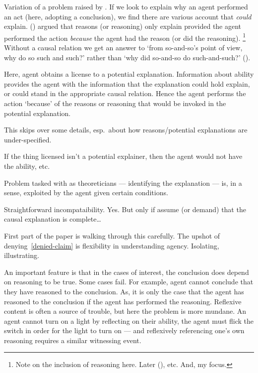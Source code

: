 \documentclass[10pt]{article}
\begin{document}
Variation of a problem raised by \citeauthor{Davidson:2001aa}.
If we look to explain why an agent performed an act (here, adopting a conclusion), we find there are various account that \emph{could} explain.
(\citeauthor[7--8]{Davidson:2001aa})
\citeauthor{Davidson:2001aa} argued that reasons (or reasoning) only explain provided the agent performed the action \emph{because} the agent had the reason (or did the reasoning).\nolinebreak
\footnote{
  Note on the inclusion of reasoning here.
  Later \citeauthor{Davidson:2001aa} (\citeyear[232]{Davidson:2001aa}), etc.
  And, my focus.
}
Without a causal relation we get an answer to ‘from so-and-so’s point of view, why do so such and such?’ rather than ‘why did so-and-so do such-and-such?’ (\cite[417]{Hieronymi:2011aa}).

Here, agent obtains a license to a potential explanation.
Information about ability provides the agent with the information that the explanation could hold explain, or could stand in the appropriate causal relation.
Hence the agent performs the action `because' of the reasons or reasoning that would be invoked in the potential explanation.

{
\color{red} This skips over some details, esp.\ about how reasons/potential explanations are under-specified.
}

If the thing licensed isn't a potential explainer, then the agent would not have the ability, etc.\

Problem tasked with as theoreticians --- identifying the explanation --- is, in a sense, exploited by the agent given certain conditions.

Straightforward incompataibility.
Yes.
But only if assume (or demand) that the causal explanation is complete\dots




{
  \color{red}
  First part of the paper is walking through this carefully.
}
The upshot of denying~\ref{denied-claim} is flexibility in understanding agency.
Isolating, illustrating.



An important feature is that in the cases of interest, the conclusion does depend on reasoning to be true.
Some cases fail.
For example, agent cannot conclude that they have reasoned to the conclusion.
As, it is only the case that the agent has reasoned to the conclusion if the agent has performed the reasoning.
Reflexive content is often a source of trouble, but here the problem is more mundane.
An agent cannot turn on a light by reflecting on their ability, the agent must flick the switch in order for the light to turn on --- and reflexively referencing one's own reasoning requires a similar witnessing event.
\end{document}
